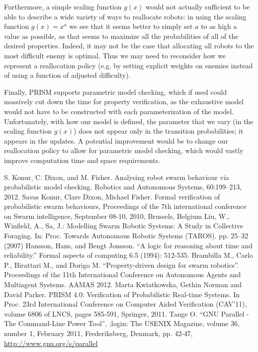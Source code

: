 \documentclass[11pt]{article}
\theoremstyle{definition}
\begin{document}
Furthermore, a simple scaling function $ g(x) $
would not actually sufficient to be able to
describe a wide variety of ways to reallocate
robots: in using the scaling function $ g(x) = x^a $
we see that it seems better to simply set
$ a $ to as high a value as possible, as that
seems to maximize all the probabilities of all
of the desired properties. Indeed, it may not be the
case that allocating all robots to the most
difficult enemy is optimal. Thus we may need
to reconsider how we represent a reallocation policy
(e.g. by setting explicit weights on enemies
instead of using a function of adjusted difficulty).

Finally, PRISM supports parametric model checking,
which if used could massively cut down the
time for property verification, as the exhaustive
model would not have to be constructed with
each parameterization of the model. Unfortunately,
with how our model is defined, the parameter
that we vary (in the scaling function $ g(x) $)
does not appear only in the transition probabilities;
it appears in the updates. A potential improvement
would be to change our reallocation policy to
allow for parametric model checking, which
would vastly improve computation time and
space requirements.

\pagebreak

\begin{thebibliography}{99}
        S. Konur, C. Dixon, and M. Fisher.
        Analysing robot swarm behaviour via probabilistic model checking.
        Robotics and Autonomous Systems, 60:199–213,
        2012.
        Savas Konur, Clare Dixon, Michael Fisher.
        Formal verification of probabilistic swarm behaviours,
        Proceedings of the 7th international conference on Swarm intelligence,
        September 08-10, 2010, Brussels, Belgium
        Liu, W., Winfield, A., Sa, J.:
        Modelling Swarm Robotic Systems: A Study in Collective Foraging.
        In: Proc. Towards Autonomous Robotic Systems (TAROS).
        pp. 25–32 (2007)
        Hansson, Hans, and Bengt Jonsson.
        ``A logic for reasoning about time and reliability.''
        Formal aspects of computing 6.5 (1994): 512-535.
        Brambilla M., Carlo P., Birattari M., and Dorigo M.
        ``Property-driven design for swarm robotics''.
        Proceedings of the 11th International Conference on
        Autonomous Agents and Multiagent Systems.
        AAMAS 2012.
        Marta Kwiatkowska, Gethin Norman and David Parker.
        PRISM 4.0: Verification of Probabilistic Real-time Systems.
        In Proc. 23rd International Conference on Computer Aided Verification
        (CAV’11),
        volume 6806 of LNCS, pages 585-591, Springer, 2011.
        Tange O.
        ``GNU Parallel - The Command-Line Power Tool'',
        ;login: The USENIX Magazine,
        volume 36, number 1, February 2011,
        Frederiksberg, Denmark,
        pp. 42-47,
        \url{http://www.gnu.org/s/parallel}
\end{thebibliography}
\end{document}
